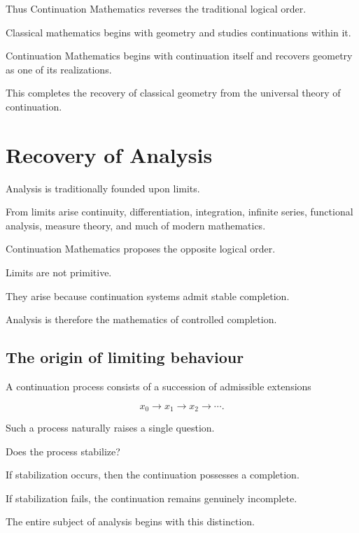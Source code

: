 \documentclass[13pt,openany]{book}
\theoremstyle{plain}
\theoremstyle{definition}
\begin{document}
Thus Continuation Mathematics reverses the traditional logical order.

Classical mathematics begins with geometry and studies continuations within
it.

Continuation Mathematics begins with continuation itself and recovers geometry
as one of its realizations.

This completes the recovery of classical geometry from the universal theory of
continuation.

\chapter{Recovery of Analysis}

Analysis is traditionally founded upon limits.

From limits arise continuity, differentiation, integration, infinite series,
functional analysis, measure theory, and much of modern mathematics.

Continuation Mathematics proposes the opposite logical order.

Limits are not primitive.

They arise because continuation systems admit stable completion.

Analysis is therefore the mathematics of controlled completion.

\section{The origin of limiting behaviour}

A continuation process consists of a succession of admissible extensions

\[
x_0
\longrightarrow
x_1
\longrightarrow
x_2
\longrightarrow
\cdots.
\]

Such a process naturally raises a single question.

Does the process stabilize?

If stabilization occurs, then the continuation possesses a completion.

If stabilization fails, the continuation remains genuinely incomplete.

The entire subject of analysis begins with this distinction.
\end{document}
